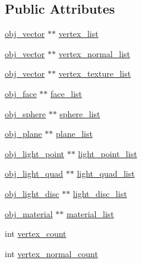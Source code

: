 \subsection*{Public Attributes}
\begin{DoxyCompactItemize}
\item 
\hyperlink{structobj__vector}{obj\+\_\+vector} $\ast$$\ast$ \hyperlink{structobj__scene__data_ae63c9e7899791d0ac616aab05d2a3d55}{vertex\+\_\+list}
\item 
\hyperlink{structobj__vector}{obj\+\_\+vector} $\ast$$\ast$ \hyperlink{structobj__scene__data_a8407af16c78de18ecb879dc627109560}{vertex\+\_\+normal\+\_\+list}
\item 
\hyperlink{structobj__vector}{obj\+\_\+vector} $\ast$$\ast$ \hyperlink{structobj__scene__data_a31170ee75ff892af0c72eace0c6da368}{vertex\+\_\+texture\+\_\+list}
\item 
\hyperlink{structobj__face}{obj\+\_\+face} $\ast$$\ast$ \hyperlink{structobj__scene__data_a64650d8d984a1c2aadab3625a29981cb}{face\+\_\+list}
\item 
\hyperlink{structobj__sphere}{obj\+\_\+sphere} $\ast$$\ast$ \hyperlink{structobj__scene__data_a48c0c2242f103292e3319d0f0ba25b6c}{sphere\+\_\+list}
\item 
\hyperlink{structobj__plane}{obj\+\_\+plane} $\ast$$\ast$ \hyperlink{structobj__scene__data_aa4963650fca6d3ffc3c8ed6c8abdd27c}{plane\+\_\+list}
\item 
\hyperlink{structobj__light__point}{obj\+\_\+light\+\_\+point} $\ast$$\ast$ \hyperlink{structobj__scene__data_ac9d4ade26879f621c8be95ef60288fc5}{light\+\_\+point\+\_\+list}
\item 
\hyperlink{structobj__light__quad}{obj\+\_\+light\+\_\+quad} $\ast$$\ast$ \hyperlink{structobj__scene__data_afc077a32a86fa4c912b2175b8ae811e4}{light\+\_\+quad\+\_\+list}
\item 
\hyperlink{structobj__light__disc}{obj\+\_\+light\+\_\+disc} $\ast$$\ast$ \hyperlink{structobj__scene__data_aa18fb1fe6d14e4c793dc01b89ac78dd8}{light\+\_\+disc\+\_\+list}
\item 
\hyperlink{structobj__material}{obj\+\_\+material} $\ast$$\ast$ \hyperlink{structobj__scene__data_a499c98456d7204cdee5b6c355577cde4}{material\+\_\+list}
\item 
int \hyperlink{structobj__scene__data_aacc76aeaa251adabba63e9e77c401fd7}{vertex\+\_\+count}
\item 
int \hyperlink{structobj__scene__data_a4b1a8b90b2041134ac4b6fd5b4238a6d}{vertex\+\_\+normal\+\_\+count}
\item 

\end{DoxyCompactItemize}

